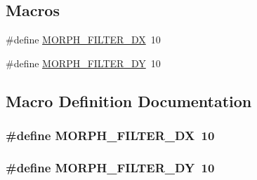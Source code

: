 \subsection*{Macros}
\begin{DoxyCompactItemize}
\item 
\#define \hyperlink{mf-sw_8h_a306e2bb4acdc55bf9dd3c719ad1e425c}{M\+O\+R\+P\+H\+\_\+\+F\+I\+L\+T\+E\+R\+\_\+\+DX}~10
\item 
\#define \hyperlink{mf-sw_8h_a0a459c81c9d83cc1aba0b3a87ec9177f}{M\+O\+R\+P\+H\+\_\+\+F\+I\+L\+T\+E\+R\+\_\+\+DY}~10
\end{DoxyCompactItemize}


\subsection{Macro Definition Documentation}
\subsubsection[{\texorpdfstring{M\+O\+R\+P\+H\+\_\+\+F\+I\+L\+T\+E\+R\+\_\+\+DX}{MORPH_FILTER_DX}}]{\setlength{\rightskip}{0pt plus 5cm}\#define M\+O\+R\+P\+H\+\_\+\+F\+I\+L\+T\+E\+R\+\_\+\+DX~10}\hypertarget{mf-sw_8h_a306e2bb4acdc55bf9dd3c719ad1e425c}{}\label{mf-sw_8h_a306e2bb4acdc55bf9dd3c719ad1e425c}
\subsubsection[{\texorpdfstring{M\+O\+R\+P\+H\+\_\+\+F\+I\+L\+T\+E\+R\+\_\+\+DY}{MORPH_FILTER_DY}}]{\setlength{\rightskip}{0pt plus 5cm}\#define M\+O\+R\+P\+H\+\_\+\+F\+I\+L\+T\+E\+R\+\_\+\+DY~10}\hypertarget{mf-sw_8h_a0a459c81c9d83cc1aba0b3a87ec9177f}{}\label{mf-sw_8h_a0a459c81c9d83cc1aba0b3a87ec9177f}
